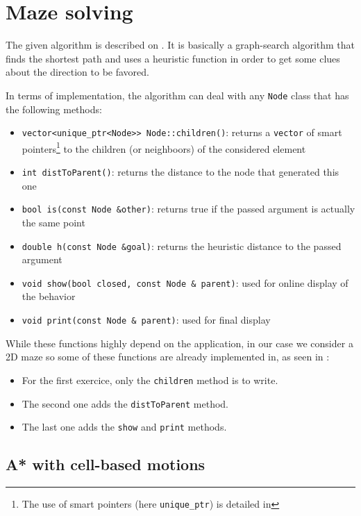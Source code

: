 \documentclass{ecnreport}
\begin{document}
\section{Maze solving}

The given algorithm is described on . It is basically a graph-search algorithm that
finds the shortest path and uses a heuristic function in order to get some clues about the direction to be favored.

In terms of implementation, the algorithm can deal with any \texttt{Node} class that has the following methods:
\begin{itemize}
 \item \texttt{vector<unique\_ptr<Node>> Node::children()}: returns a \texttt{vector} of smart pointers\footnote{The use of smart pointers (here \texttt{unique\_ptr}) is detailed in } to the children (or neighboors) of the considered
 element
 \item \texttt{int distToParent()}: returns the distance to the node that generated this one
 \item \texttt{bool is(const Node \&other)}: returns true if the passed argument is actually the same point
 \item \texttt{double h(const Node \&goal)}: returns the heuristic distance to the passed argument
 \item \texttt{void show(bool closed, const Node \& parent)}: used for online display of the behavior
 \item \texttt{void print(const Node \& parent)}: used for final display
\end{itemize}


While these functions highly depend on the application, in our case we consider a 2D maze so some of these functions are already implemented in, as seen in :
\begin{itemize}
 \item For the first exercice, only the \texttt{children} method is to write.
 \item The second one adds the \texttt{distToParent} method.
 \item The last one adds the \texttt{show} and \texttt{print} methods.
\end{itemize}



\subsection{A* with cell-based motions}
\end{document}
